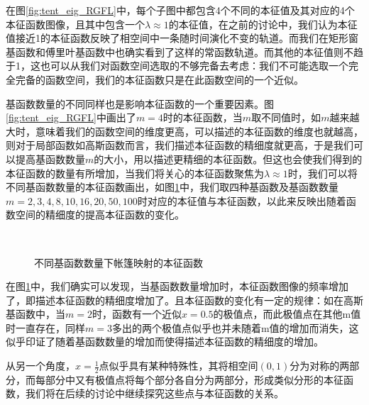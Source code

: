 在图\ref{fig:tent_eig_RGFL}中，每个子图中都包含4个不同的本征值及其对应的4个本征函数图像，且其中包含一个$\lambda\approx 1$的本征值，在之前的讨论中，我们认为本征值接近1的本征函数反映了相空间中一条随时间演化不变的轨道。而我们在矩形窗基函数和傅里叶基函数中也确实看到了这样的常函数轨道。而其他的本征值则不趋于1，这也可以从我们对函数空间选取的不够完备去考虑：我们不可能选取一个完全完备的函数空间，我们的本征函数只是在此函数空间的一个近似。

基函数数量的不同同样也是影响本征函数的一个重要因素。图\ref{fig:tent_eig_RGFL}中画出了$m=4$时的本征函数，当$m$取不同值时，如$m$越来越大时，意味着我们的函数空间的维度更高，可以描述的本征函数的维度也就越高，则对于局部函数如高斯函数而言，我们描述本征函数的精细度就更高，于是我们可以提高基函数数量$m$的大小，用以描述更精细的本征函数。但这也会使我们得到的本征函数的数量有所增加，当我们将关心的本征函数聚焦为$\lambda\approx 1$时，我们可以将不同基函数数量的本征函数画出，如图\ref{fig:tent_eig_RGFL_multim}中，我们取四种基函数及基函数数量$m=2,3,4,8,10,16,20,50,100$时对应的本征值与本征函数，以此来反映出随着函数空间的精细度的提高本征函数的变化。

\begin{figure}[!]
  \centering
    \\
  \caption{不同基函数数量下帐篷映射的本征函数}\label{fig:tent_eig_RGFL_multim}
\end{figure}

在图\ref{fig:tent_eig_RGFL_multim}中，我们确实可以发现，当基函数数量增加时，本征函数图像的频率增加了，即描述本征函数的精细度增加了。且本征函数的变化有一定的规律：如在高斯基函数中，当$m=2$时，函数有一个近似$x=0.5$的极值点，而此极值点在其他m值时一直存在，同样$m=3$多出的两个极值点似乎也并未随着m值的增加而消失，这似乎印证了随着基函数数量的增加而使得描述本征函数的精细度的增加。

从另一个角度，$x=\frac{1}{2}$点似乎具有某种特殊性，其将相空间$(0,1)$分为对称的两部分，而每部分中又有极值点将每个部分各自分为两部分，形成类似分形的本征函数，我们将在后续的讨论中继续探究这些点与本征函数的关系。

